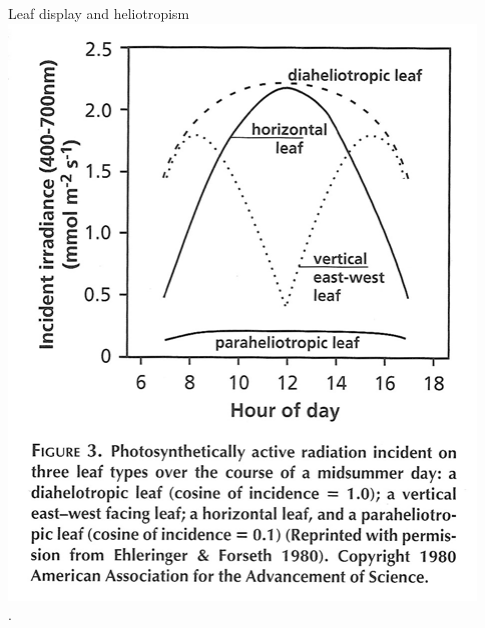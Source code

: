 \documentclass[10pt]{beamer}
\begin{document}
\begin{frame}{Leaf display and heliotropism}
    \centering\includegraphics[height=0.7\textheight]{figures/Lambers3HeliotropicIrradiance}\\
    {\small \autocite[from][]{LambersEtAl1998}.}
\end{frame}
\end{document}
